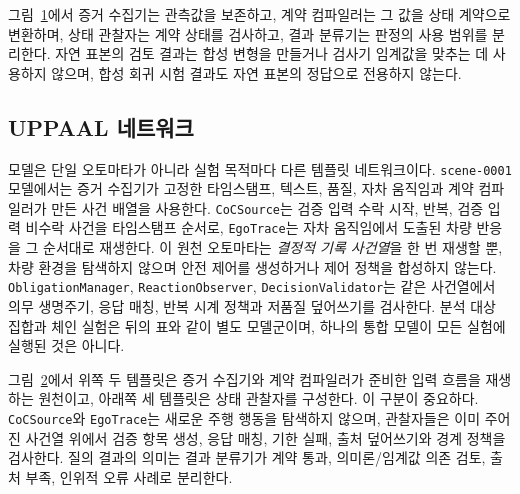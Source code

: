 \begin{figure}[t]
\centering

\label{fig:method-pipeline}
\end{figure}

그림~\ref{fig:method-pipeline}에서 증거 수집기는 관측값을 보존하고, 계약 컴파일러는 그 값을 상태 계약으로 변환하며, 상태 관찰자는 계약 상태를 검사하고, 결과 분류기는 판정의 사용 범위를 분리한다. 자연 표본의 검토 결과는 합성 변형을 만들거나 검사기 임계값을 맞추는 데 사용하지 않으며, 합성 회귀 시험 결과도 자연 표본의 정답으로 전용하지 않는다.

\subsection{UPPAAL 네트워크}
\uppaal 모델은 단일 오토마타가 아니라 실험 목적마다 다른 템플릿 네트워크이다. \texttt{scene-0001} 모델에서는 증거 수집기가 고정한 타임스탬프, 텍스트, 품질, 자차 움직임과 계약 컴파일러가 만든 사건 배열을 사용한다. \texttt{CoCSource}는 검증 입력 수락 시작, 반복, 검증 입력 비수락 사건을 타임스탬프 순서로, \texttt{EgoTrace}는 자차 움직임에서 도출된 차량 반응을 그 순서대로 재생한다. 이 원천 오토마타는 \emph{결정적 기록 사건열}을 한 번 재생할 뿐, 차량 환경을 탐색하지 않으며 안전 제어를 생성하거나 제어 정책을 합성하지 않는다. \texttt{ObligationManager}, \texttt{ReactionObserver}, \texttt{DecisionValidator}는 같은 사건열에서 의무 생명주기, 응답 매칭, 반복 시계 정책과 저품질 덮어쓰기를 검사한다. 분석 대상 집합과 체인 실험은 뒤의 표와 같이 별도 모델군이며, 하나의 통합 모델이 모든 실험에 실행된 것은 아니다.

\begin{figure}[t]
\centering

\label{fig:uppaal-network}
\end{figure}

그림~\ref{fig:uppaal-network}에서 위쪽 두 템플릿은 증거 수집기와 계약 컴파일러가 준비한 입력 흐름을 재생하는 원천이고, 아래쪽 세 템플릿은 상태 관찰자를 구성한다. 이 구분이 중요하다. \texttt{CoCSource}와 \texttt{EgoTrace}는 새로운 주행 행동을 탐색하지 않으며, 관찰자들은 이미 주어진 사건열 위에서 검증 항목 생성, 응답 매칭, 기한 실패, 출처 덮어쓰기와 경계 정책을 검사한다. 질의 결과의 의미는 결과 분류기가 계약 통과, 의미론/임계값 의존 검토, 출처 부족, 인위적 오류 사례로 분리한다.

